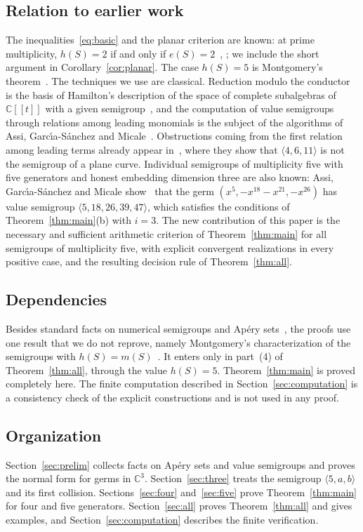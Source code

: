 \documentclass{amsart}
\theoremstyle{definition}
\theoremstyle{remark}
\numberwithin{equation}{section}
\newcommand{\C}{\mathbb{C}}
\newcommand{\gen}[1]{\langle #1\rangle}
\begin{document}
\subsection*{Relation to earlier work}
The inequalities~\eqref{eq:basic} and the planar criterion are known: at prime multiplicity, $h(S)=2$ if and only if $e(S)=2$~\cite{Bre}, \cite[Section~6.1]{Mon}; we include the short argument in Corollary~\ref{cor:planar}. The case $h(S)=5$ is Montgomery's theorem~\cite[Theorem~2 and Proposition~1]{Mon}. The techniques we use are classical. Reduction modulo the conductor is the basis of Hamilton's description of the space of complete subalgebras of $\C[[t]]$ with a given semigroup~\cite{Ham}, and the computation of value semigroups through relations among leading monomials is the subject of the algorithms of Assi, Garc\'{\i}a-S\'anchez and Micale~\cite{AGM}. Obstructions coming from the first relation among leading terms already appear in~\cite[Remark~4.5]{Ham}, where they show that $\gen{4,6,11}$ is not the semigroup of a plane curve. Individual semigroups of multiplicity five with five generators and honest embedding dimension three are also known: Assi, Garc\'{\i}a-S\'anchez and Micale show~\cite[Example~2.17]{AGM} that the germ $(x^5,-x^{18}-x^{21},-x^{26})$ has value semigroup $\gen{5,18,26,39,47}$, which satisfies the conditions of Theorem~\ref{thm:main}(b) with $i=3$. The new contribution of this paper is the necessary and sufficient arithmetic criterion of Theorem~\ref{thm:main} for all semigroups of multiplicity five, with explicit convergent realizations in every positive case, and the resulting decision rule of Theorem~\ref{thm:all}.

\subsection*{Dependencies}
Besides standard facts on numerical semigroups and Ap\'ery sets~\cite{RGS}, the proofs use one result that we do not reprove, namely Montgomery's characterization of the semigroups with $h(S)=m(S)$~\cite[Theorem~2 and Proposition~1]{Mon}. It enters only in part~(4) of Theorem~\ref{thm:all}, through the value $h(S)=5$. Theorem~\ref{thm:main} is proved completely here. The finite computation described in Section~\ref{sec:computation} is a consistency check of the explicit constructions and is not used in any proof.

\subsection*{Organization}
Section~\ref{sec:prelim} collects facts on Ap\'ery sets and value semigroups and proves the normal form for germs in $\C^3$. Section~\ref{sec:three} treats the semigroup $\gen{5,a,b}$ and its first collision. Sections~\ref{sec:four} and~\ref{sec:five} prove Theorem~\ref{thm:main} for four and five generators. Section~\ref{sec:all} proves Theorem~\ref{thm:all} and gives examples, and Section~\ref{sec:computation} describes the finite verification.
\end{document}
